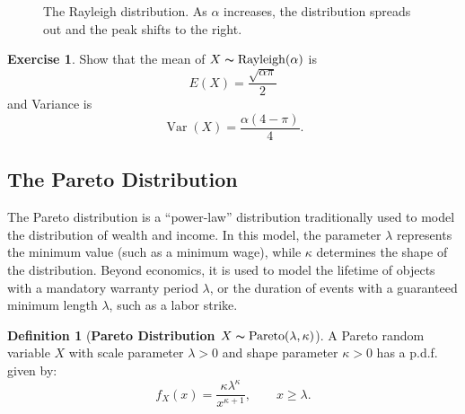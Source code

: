 \documentclass[12pt,a4paper]{report}
\theoremstyle{definition}
\newtheorem{definition}[thm]{Definition}
\newtheorem{exe}[thm]{Exercise}
\theoremstyle{plain}
\theoremstyle{definition}
\begin{document}
\begin{figure}[H]
\centering
{}
\caption{The Rayleigh distribution. As $\alpha$ increases, the distribution spreads out and the peak shifts to the right.}
\end{figure}


\begin{exe}
Show that the mean of $X \thicksim \operatorname{Rayleigh}(\alpha)$ is \[E(X) = \frac{\sqrt{\alpha \pi}}{2}\] and Variance is \[\operatorname{Var}(X) = \frac{\alpha (4 - \pi)}{4}.\]
\end{exe}


\subsection{The Pareto Distribution}
\vspace{-15pt}
The Pareto distribution is a ``power-law'' distribution traditionally used to model the distribution of wealth and income. In this model, the parameter $\lambda$ represents the minimum value (such as a minimum wage), while $\kappa$ determines the shape of the distribution. Beyond economics, it is used to model the lifetime of objects with a mandatory warranty period $\lambda$, or the duration of events with a guaranteed minimum length $\lambda$, such as a labor strike.

\begin{definition}[\textbf{Pareto Distribution $X\thicksim\operatorname{Pareto}(\lambda, \kappa)$}]
A Pareto random variable $X$ with scale parameter $\lambda > 0$ and shape parameter $\kappa > 0$ has a p.d.f. given by:\[f_X(x) = \frac{\kappa \lambda^{\kappa}}{x^{\kappa + 1}}, \quad\quad x \geq \lambda.\]
\end{definition}
\end{document}
